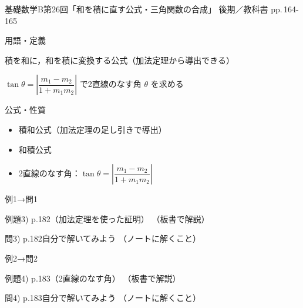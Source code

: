 \documentclass[aspectratio=43,professionalfonts,handout]{beamer}
\newcommand{\LectureNum}{26}
\newcommand{\LectureTitle}{和を積に直す公式・三角関数の合成}
\newcommand{\TextPages}{pp.\,164-165}
\newcommand{\CourseName}{基礎数学B}
\renewcommand{\TermName}{後期}
\begin{document}
\begin{frame}{\CourseName\quad 第\LectureNum 回「\LectureTitle 」}
  {\small \TermName\quad \TeacherName\quad ／\quad 教科書 \TextPages}

  \begin{block}{用語・定義}
  \begin{description}[labelwidth=5.5em]
    \item[\kw{積和・和積公式（参考）}] 積を和に，和を積に変換する公式（加法定理から導出できる）
    \item[\kw{2直線のなす角への応用}] $\tan\theta = \left|\dfrac{m_1 - m_2}{1 + m_1 m_2}\right|$ で2直線のなす角 $\theta$ を求める
  \end{description}
  \end{block}
\end{frame}

\begin{frame}{公式・性質}
  \begin{block}{}
  \begin{itemize}
    \item 積和公式（加法定理の足し引きで導出）
    \item 和積公式
    \item 2直線のなす角：$\tan\theta = \left|\dfrac{m_1 - m_2}{1 + m_1 m_2}\right|$
  \end{itemize}
  \end{block}
\end{frame}

\begin{frame}{例1→問1}
  \begin{exampleblock}{例題3) p.182（加法定理を使った証明）}
    （板書で解説）
  \end{exampleblock}

  \vfill

  \begin{block}{問3) p.182\quad 自分で解いてみよう}
    （ノートに解くこと）
  \end{block}
\end{frame}

\begin{frame}{例2→問2}
  \begin{exampleblock}{例題4) p.183（2直線のなす角）}
    （板書で解説）
  \end{exampleblock}

  \vfill

  \begin{block}{問4) p.183\quad 自分で解いてみよう}
    （ノートに解くこと）
  \end{block}
\end{frame}
\end{document}
